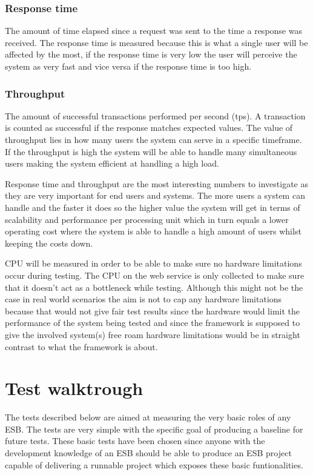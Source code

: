 \subsubsection{Response time}
The amount of time elapsed since a request was sent to the time a response was received. 
The response time is measured because this is what a single user will be affected by the most, if the response time is very low the user will perceive the system as very fast and vice versa if the response time is too high.

\newpage
\subsubsection{Throughput}
The amount of successful transactions performed per second (tps). A transaction is counted as successful if the response matches expected values.
The value of throughput lies in how many users the system can serve in a specific timeframe. If the throughput is high the system will be able to handle many simultaneous users making the system efficient at handling a high load.

Response time and throughput are the most interesting numbers to investigate as they are very important for end users and systems. 
The more users a system can handle and the faster it does so the higher value the system will get in terms of scalability and performance per processing unit which in turn equals a lower operating cost where the system is able to handle a high amount of users whilst keeping the costs down.

CPU will be measured in order to be able to make sure no hardware limitations occur during testing. 
The CPU on the web service is only collected to make sure that it doesn't act as a bottleneck while testing. 
Although this might not be the case in real world scenarios the aim is not to cap any hardware limitations because that would not give fair test results since the hardware would limit the performance of the system being tested and since the framework is supposed to give the involved system(s) free roam hardware limitations would be in straight contrast to what the framework is about.

\section{Test walktrough}
The tests described below are aimed at measuring the very basic roles of any ESB. 
The tests are very simple with the specific goal of producing a baseline for future tests. 
These basic tests have been chosen since anyone with the development knowledge of an ESB should be able to produce an ESB project capable of delivering a runnable project which exposes these basic funtionalities.

